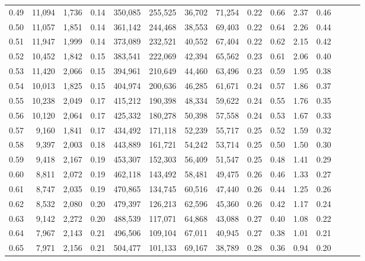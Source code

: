 \begin{tabular}{rrrrrrrrrrrrrrr}
0.49 &  11,094 &  1,736 &  0.14 &  350,085 &  255,525 &   36,702 &   71,254 &  0.22 &  0.66 &  2.37 &      0.46 \\
0.50 &  11,057 &  1,851 &  0.14 &  361,142 &  244,468 &   38,553 &   69,403 &  0.22 &  0.64 &  2.26 &      0.44 \\
0.51 &  11,947 &  1,999 &  0.14 &  373,089 &  232,521 &   40,552 &   67,404 &  0.22 &  0.62 &  2.15 &      0.42 \\
0.52 &  10,452 &  1,842 &  0.15 &  383,541 &  222,069 &   42,394 &   65,562 &  0.23 &  0.61 &  2.06 &      0.40 \\
0.53 &  11,420 &  2,066 &  0.15 &  394,961 &  210,649 &   44,460 &   63,496 &  0.23 &  0.59 &  1.95 &      0.38 \\
0.54 &  10,013 &  1,825 &  0.15 &  404,974 &  200,636 &   46,285 &   61,671 &  0.24 &  0.57 &  1.86 &      0.37 \\
0.55 &  10,238 &  2,049 &  0.17 &  415,212 &  190,398 &   48,334 &   59,622 &  0.24 &  0.55 &  1.76 &      0.35 \\
0.56 &  10,120 &  2,064 &  0.17 &  425,332 &  180,278 &   50,398 &   57,558 &  0.24 &  0.53 &  1.67 &      0.33 \\
0.57 &   9,160 &  1,841 &  0.17 &  434,492 &  171,118 &   52,239 &   55,717 &  0.25 &  0.52 &  1.59 &      0.32 \\
0.58 &   9,397 &  2,003 &  0.18 &  443,889 &  161,721 &   54,242 &   53,714 &  0.25 &  0.50 &  1.50 &      0.30 \\
0.59 &   9,418 &  2,167 &  0.19 &  453,307 &  152,303 &   56,409 &   51,547 &  0.25 &  0.48 &  1.41 &      0.29 \\
0.60 &   8,811 &  2,072 &  0.19 &  462,118 &  143,492 &   58,481 &   49,475 &  0.26 &  0.46 &  1.33 &      0.27 \\
0.61 &   8,747 &  2,035 &  0.19 &  470,865 &  134,745 &   60,516 &   47,440 &  0.26 &  0.44 &  1.25 &      0.26 \\
0.62 &   8,532 &  2,080 &  0.20 &  479,397 &  126,213 &   62,596 &   45,360 &  0.26 &  0.42 &  1.17 &      0.24 \\
0.63 &   9,142 &  2,272 &  0.20 &  488,539 &  117,071 &   64,868 &   43,088 &  0.27 &  0.40 &  1.08 &      0.22 \\
0.64 &   7,967 &  2,143 &  0.21 &  496,506 &  109,104 &   67,011 &   40,945 &  0.27 &  0.38 &  1.01 &      0.21 \\
0.65 &   7,971 &  2,156 &  0.21 &  504,477 &  101,133 &   69,167 &   38,789 &  0.28 &  0.36 &  0.94 &      0.20 \\

\end{tabular}
